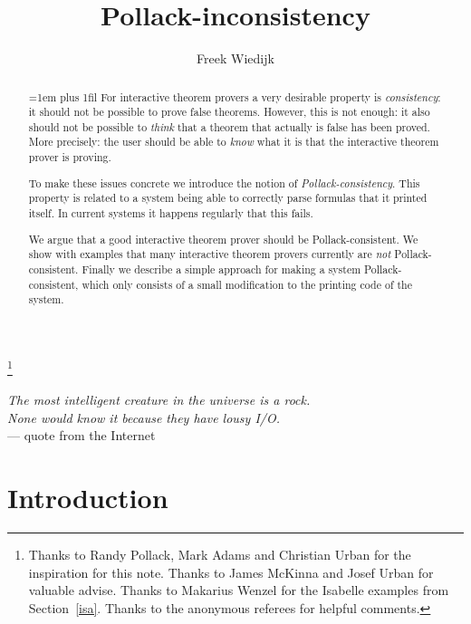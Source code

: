 \documentclass{entcs}
\begin{document}
\begin{frontmatter}
\title{Pollack-inconsistency}
\author{Freek Wiedijk}
\global\def\lastname{Wiedijk}
\address{Institute for Computing and Information Sciences \\
Radboud University Nijmegen \\
Heyendaalseweg 135, 6525 AJ Nijmegen, The Netherlands}

\begin{abstract}
\parfillskip=1em plus 1fil
For interactive theorem provers a very desirable property is \emph{consistency}:
it should not be possible to prove false theorems.
However, this is not enough:
it also should not be possible to
\emph{think}
that a theorem that actually is false has been proved.
More precisely: the user should be able to \emph{know} what it is that
the interactive theorem prover is proving.

To make these issues concrete
we introduce the notion of \emph{Pollack-con\-sis\-ten\-cy}.
This property is related to a system
being able to correctly parse formulas that it printed itself.
In current systems it happens regularly that this fails.

We argue that a good interactive theorem prover should be Pollack-consistent.
We show with examples that many interactive theorem provers currently are
\emph{not} Pollack-consistent.
Finally we describe a simple approach for
making a system Pollack-consistent,
which only consists of a small modification to the printing code of the system.

\end{abstract}

\thanks[rap]{Thanks to Randy Pollack, Mark Adams and Christian Urban for the inspiration for this note.
Thanks to James McKinna and Josef Urban for valuable advise.
Thanks to Makarius Wenzel for the Isabelle examples from Section~\ref{isa}.
Thanks to the anonymous referees for helpful comments.}
\end{frontmatter}

\begin{flushright}
\bigskip
\small
\emph{The most intelligent creature in the universe is a rock. \\
None would know it because they have lousy I/O.} \\
\smallskip
--- quote from the Internet%
\end{flushright}

\section{Introduction}
\end{document}
